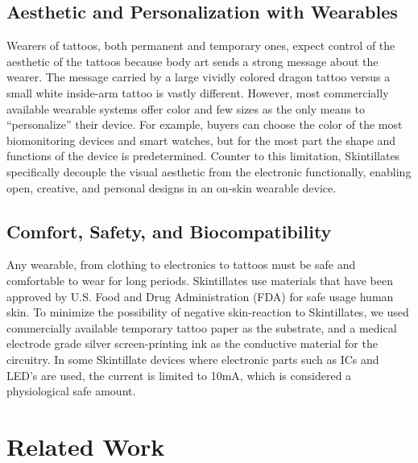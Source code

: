 \documentclass{sigchi}
\begin{document}
\subsection{Aesthetic and Personalization with Wearables}
Wearers of tattoos, both permanent and temporary ones, expect control of the aesthetic of the tattoos because body art sends a strong message about the wearer\cite{Doss:2009ee,McLeod:2014ua}. The message carried by a large vividly colored dragon tattoo versus a small white inside-arm tattoo is vastly different. However, most commercially available wearable systems offer color and few sizes as the only means to “personalize” their device. For example, buyers can choose the color of the most biomonitoring devices and smart watches, but for the most part the shape and functions of the device is predetermined. Counter to this limitation, Skintillates specifically decouple the visual aesthetic from the electronic functionally, enabling open, creative, and personal designs in an on-skin wearable device.

\subsection{Comfort, Safety, and Biocompatibility}
Any wearable, from clothing to electronics to tattoos must be safe and comfortable to wear for long periods.  Skintillates use materials that have been approved by U.S. Food and Drug Administration (FDA) for safe usage human skin. To minimize the possibility of negative skin-reaction to Skintillates, we used commercially available temporary tattoo paper as the substrate, and a medical electrode grade silver screen-printing ink as the conductive material for the circuitry\cite{Anonymous:6vWXbuD5}. In some Skintillate devices where electronic parts such as ICs and LED's are used, the current is limited to 10mA, which is considered a physiological safe amount\cite{Scherz:_BfVY1Mg}. 

\section{Related Work}
\end{document}
